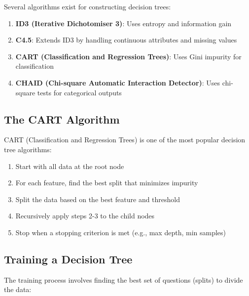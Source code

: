 \documentclass[
  letterpaper,
  DIV=11,
  numbers=noendperiod]{scrreprt}
\providecommand{\tightlist}{%
  \setlength{\itemsep}{0pt}\setlength{\parskip}{0pt}}\usepackage{longtable,booktabs,array}
\begin{document}
Several algorithms exist for constructing decision trees:

\begin{enumerate}
\def\labelenumi{\arabic{enumi}.}
\tightlist
\item
  \textbf{ID3 (Iterative Dichotomiser 3)}: Uses entropy and information
  gain
\item
  \textbf{C4.5}: Extends ID3 by handling continuous attributes and
  missing values
\item
  \textbf{CART (Classification and Regression Trees)}: Uses Gini
  impurity for classification
\item
  \textbf{CHAID (Chi-square Automatic Interaction Detector)}: Uses
  chi-square tests for categorical outputs
\end{enumerate}

\subsection{The CART Algorithm}\label{the-cart-algorithm}

CART (Classification and Regression Trees) is one of the most popular
decision tree algorithms:

\begin{enumerate}
\def\labelenumi{\arabic{enumi}.}
\tightlist
\item
  Start with all data at the root node
\item
  For each feature, find the best split that minimizes impurity
\item
  Split the data based on the best feature and threshold
\item
  Recursively apply steps 2-3 to the child nodes
\item
  Stop when a stopping criterion is met (e.g., max depth, min samples)
\end{enumerate}

\subsection{Training a Decision Tree}\label{training-a-decision-tree}

The training process involves finding the best set of questions (splits)
to divide the data:
\end{document}
